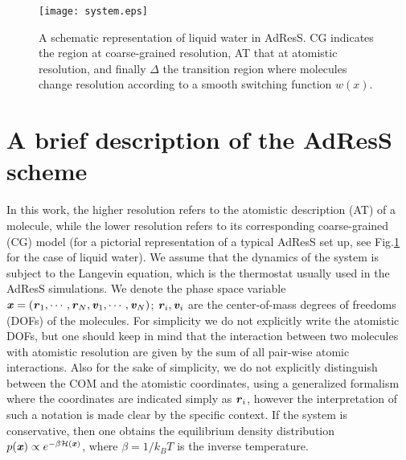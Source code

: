 \documentclass[aip,jcp,a4paper,reprint,onecolumn]{revtex4-1}
\newcommand{\redc}[1]{{\color{red} #1}}
\newcommand{\vect}[1]{\textbf{\textit{#1}}}
\newcommand{\dd}[1]{\textsf{#1}}
\begin{document}
\begin{figure}
  \centering
  \texttt{[image: system.eps]}
  \caption{A schematic representation of liquid water in AdResS. CG indicates the region at coarse-grained resolution, AT that at atomistic resolution, and finally $\Delta$ the transition region where molecules change resolution according to a smooth switching function $w(x)$.}
  \label{fig:adress-water}
\end{figure}

\section{A brief description of the AdResS scheme}

In this work, the higher resolution refers to the atomistic
description (AT) of a molecule, while the lower resolution refers to
its corresponding coarse-grained (CG) model (for a pictorial representation of a typical AdResS set up, see Fig.\ref{fig:adress-water} for the case of liquid water).
We assume that the dynamics of the
system is subject to the Langevin equation, which is the thermostat
usually used in the AdResS simulations.
We denote the
phase space variable $\vect x = (\vect r_1,\cdots,\vect r_N, \vect v_1,\cdots,\vect v_N)$; $\vect r_i,
\vect v_i$ are the \redc{center-of-mass}
degrees of freedoms (DOFs) of the \redc{molecules}.
\redc{For simplicity we do not explicitly write the
  atomistic DOFs, but one should keep in mind that the interaction
  between two  molecules with atomistic resolution
  are given by the sum of all pair-wise atomic interactions.
  Also for the sake of simplicity,
  we do not explicitly distinguish between the COM and the atomistic coordinates,
  using a generalized formalism where the coordinates are indicated simply as $\vect r_i$, however the interpretation of such a notation is
  made clear by the specific context.
}
If the
system is conservative, %
then one obtains the equilibrium density distribution $p(\vect
x)\propto e^{-\beta\mathcal H(\vect x)}$, where $\beta = 1/k_BT$ is the inverse temperature.
\end{document}
